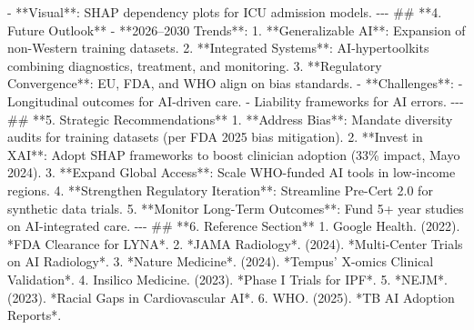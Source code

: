 \documentclass{article}%
\begin{document}
%
{-} **Visual**: SHAP dependency plots for ICU admission models.\newline%
%
{-}{-}{-}\newline%
%
\#\# **4. Future Outlook**\newline%
%
{-} **2026–2030 Trends**:\newline%
%
1. **Generalizable AI**: Expansion of non{-}Western training datasets.\newline%
%
2. **Integrated Systems**: AI{-}hypertoolkits combining diagnostics, treatment, and monitoring.\newline%
%
3. **Regulatory Convergence**: EU, FDA, and WHO align on bias standards.\newline%
%
{-} **Challenges**:\newline%
%
{-} Longitudinal outcomes for AI{-}driven care.\newline%
%
{-} Liability frameworks for AI errors.\newline%
%
{-}{-}{-}\newline%
%
\#\# **5. Strategic Recommendations**\newline%
%
1. **Address Bias**: Mandate diversity audits for training datasets (per FDA 2025 bias mitigation).\newline%
%
2. **Invest in XAI**: Adopt SHAP frameworks to boost clinician adoption (33\% impact, Mayo 2024).\newline%
%
3. **Expand Global Access**: Scale WHO{-}funded AI tools in low{-}income regions.\newline%
%
4. **Strengthen Regulatory Iteration**: Streamline Pre{-}Cert 2.0 for synthetic data trials.\newline%
%
5. **Monitor Long{-}Term Outcomes**: Fund 5+ year studies on AI{-}integrated care.\newline%
%
{-}{-}{-}\newline%
%
\#\# **6. Reference Section**\newline%
%
1. Google Health. (2022). *FDA Clearance for LYNA*.\newline%
%
2. *JAMA Radiology*. (2024). *Multi{-}Center Trials on AI Radiology*.\newline%
%
3. *Nature Medicine*. (2024). *Tempus’ X{-}omics Clinical Validation*.\newline%
%
4. Insilico Medicine. (2023). *Phase I Trials for IPF*.\newline%
%
5. *NEJM*. (2023). *Racial Gaps in Cardiovascular AI*.\newline%
%
6. WHO. (2025). *TB AI Adoption Reports*.\newline%
\end{document}
